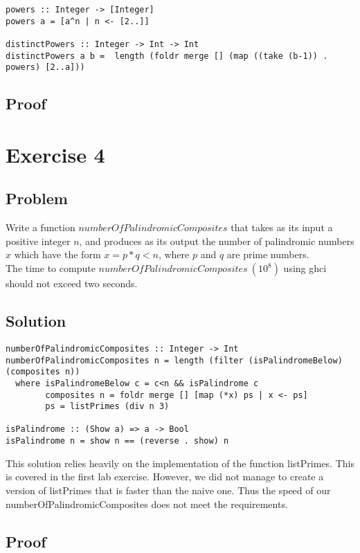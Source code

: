 \documentclass[a4paper,11pt]{article}
\begin{document}
\begin{lstlisting}
powers :: Integer -> [Integer]
powers a = [a^n | n <- [2..]]

distinctPowers :: Integer -> Int -> Int
distinctPowers a b =  length (foldr merge [] (map ((take (b-1)) . powers) [2..a]))
\end{lstlisting}

\subsection{Proof}

\section{Exercise 4}
\subsection{Problem}
Write a function $numberOfPalindromicComposites$ that takes as its input a positive integer $n$, and
produces as its output the number of palindromic numbers $x$ which have the form $x=p*q<n$, where $p$
and $q$ are prime numbers.\\
The time to compute $numberOfPalindromicComposites\: (10^8)$ using ghci should not exceed
two seconds.

\subsection{Solution}

\begin{lstlisting}
numberOfPalindromicComposites :: Integer -> Int
numberOfPalindromicComposites n = length (filter (isPalindromeBelow) (composites n))
  where isPalindromeBelow c = c<n && isPalindrome c
        composites n = foldr merge [] [map (*x) ps | x <- ps]
        ps = listPrimes (div n 3)

isPalindrome :: (Show a) => a -> Bool
isPalindrome n = show n == (reverse . show) n
\end{lstlisting}

This solution relies heavily on the implementation of the function listPrimes. This is covered in the first lab exercise. However, we did not manage to create a version of listPrimes that is faster than the naive one. Thus the speed of our numberOfPalindromicComposites does not meet the requirements.

\subsection{Proof}
\end{document}
